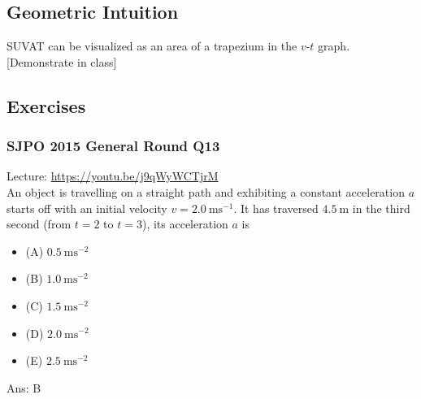 \documentclass{article}
\begin{document}
\subsection{Geometric Intuition}
SUVAT can be visualized as an area of a trapezium in the $v\text{-}t$ graph. [Demonstrate in class]


\subsection{Exercises}
\begin{samepage}
\subsubsection{SJPO 2015 General Round Q13}
Lecture: \url{https://youtu.be/j9qWyWCTjrM} \\[10pt]
An object is travelling on a straight path and exhibiting a constant acceleration $a$ starts off with an initial velocity $v=2.0 \mathrm{~ms}^{-1}$. It has traversed $4.5 \mathrm{~m}$ in the third second (from $t=2$ to $t=3$), its acceleration $a$ is
\begin{itemize}\item[](A) $0.5 \mathrm{~ms}^{-2}$
\item[](B) $1.0 \mathrm{~ms}^{-2}$
\item[](C) $1.5 \mathrm{~ms}^{-2}$
\item[](D) $2.0 \mathrm{~ms}^{-2}$
\item[](E) $2.5 \mathrm{~ms}^{-2}$
\end{itemize}
Ans: \ifpaper B \fi
\end{samepage}
\\[20pt]
\end{document}
